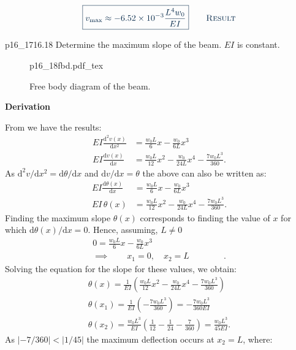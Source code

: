 \documentclass[a4paper]{article}
\newcommand{\incfig}[2][1]{%
  \def\svgwidth{#1\columnwidth}
  {#2.pdf_tex}
}
\newcounter{problem}
\numberwithin{equation}{problem}
\newcommand{\AUheading}[1]{%
  \par\vspace{.4\baselineskip}%
  {\sffamily\bfseries\color{AUblueDark}#1\par}%
  \nobreak%
}
\newenvironment{derivation}[1][Derivation]{%
  \AUheading{#1}
  \begingroup\allowdisplaybreaks
  \setlength{\abovedisplayskip}{6pt}%
  \setlength{\belowdisplayskip}{6pt}%
  \setlength{\abovedisplayshortskip}{4pt}%
  \setlength{\belowdisplayshortskip}{4pt}%
}{\par\endgroup\medskip}
\newcommand{\finalresult}[1]{%
  \vspace{.2\baselineskip}%
  \begin{equation}
    {\color{AUblueDark}\boxed{\displaystyle #1}}
    \tag*{\textsc{\textcolor{AUblueDark}{Result}}}
  \end{equation}
  \newpage
}
\begin{document}
\finalresult{
v_{\mathrm{max}} \approx \num{-6,52e-3} \frac{L^{4}w_0}{EI}
}

\begin{problemwithimage}{p16_17}{16.18}
  Determine the maximum slope of the beam.
  $EI$ is constant.
\end{problemwithimage}

\begin{figure}[ht]
    \centering
    \incfig{p16_18fbd}
    \caption{Free body diagram of the beam.}
    \label{fig:p16_18fbd}
\end{figure}


\begin{derivation}
  From  we have the results:
  \begin{align*}
    EI \frac{\mathrm{d}^2 v(x)}{\mathrm{d}x^2} &= \frac{w_0 L}{6}x - \frac{w_0}{6 L}x^3 \\
    EI \frac{\mathrm{d}v(x)}{\mathrm{d}x} &= \frac{w_0 L}{12}x^2 - \frac{w_0}{24L}x^{4} - \frac{7 w_0 L^3}{360}
  .\end{align*}
  As $\mathrm{d}^2v / \mathrm{d}x^2 = \mathrm{d}\theta / \mathrm{d}x$ and $\mathrm{d}v / \mathrm{d}x = \theta$ the above can also be written as:
  \begin{align*}
    EI \frac{\mathrm{d}\theta(x)}{\mathrm{d}x} &= \frac{w_0 L}{6}x - \frac{w_0}{6 L}x^3 \\
    EI \,  \theta(x) &= \frac{w_0 L}{12}x^2 - \frac{w_0}{24L}x^{4} - \frac{7 w_0 L^3}{360}
  .\end{align*}
  Finding the maximum slope $\theta(x)$ corresponds to finding the value of $x$ for which $\mathrm{d}\theta(x) / \mathrm{d}x = 0$.
  Hence, assuming, $L \neq 0$
  \begin{gather*}
    0 = \frac{w_0 L}{6} x - \frac{w_0}{6 L} x^3 \\
    \implies \qquad x_1 = 0, \quad x_2 = L \phantom{\qquad \implies}
  .\end{gather*}
  Solving the equation for the slope for these values, we obtain:
  \begin{gather*}
    \theta (x) = \frac{1}{EI} \left( \frac{w_0 L}{12} x^2 - \frac{w_0}{24 L} x^{4} - \frac{7 w_0 L^3}{360} \right) \\
    \theta(x_1) = \frac{1}{EI} \left( - \frac{7 w_0 L^3}{360} \right) = - \frac{7 w_0 L^3}{360 EI} \\
    \theta(x_2) = \frac{w_0 L^3}{EI} \left( \frac{1}{12} - \frac{1}{24} - \frac{7}{360} \right) = \frac{w_0 L^3}{45 EI}
  .\end{gather*}
  As $\left| - 7 / 360 \right| < \left| 1 / 45 \right|$ the maximum deflection occurs at $x_2 = L$, where:
\end{derivation}
\end{document}
